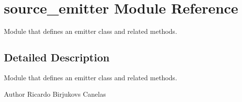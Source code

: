 \hypertarget{namespacesource__emitter}{}\section{source\+\_\+emitter Module Reference}
\label{namespacesource__emitter}


Module that defines an emitter class and related methods.  




\subsection{Detailed Description}
Module that defines an emitter class and related methods. 

\begin{DoxyAuthor}{Author}
Ricardo Birjukovs Canelas 
\end{DoxyAuthor}
